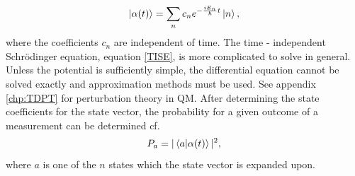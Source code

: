 \begin{equation}
	\ket{\alpha(t)}=\sum_nc_ne^{-\frac{iE_n}{\hbar}t}\ket{n},
	\label{statevec}
\end{equation} 
where the coefficients $c_n$ are independent of time. The time - independent Schrödinger equation, equation \eqref{TISE}, is more complicated to solve in general. Unless the potential is sufficiently simple, the differential equation cannot be solved exactly and approximation methods must be used. See appendix \ref{chp:TDPT} for perturbation theory in QM.
After determining the state coefficients for the state vector, the probability for a given outcome of a measurement can be determined cf.
\begin{equation}
	P_{a}=|\braket{a|\alpha(t)}|^2,
\end{equation} 
where $a$ is one of the $n$ states which the state vector is expanded upon.
